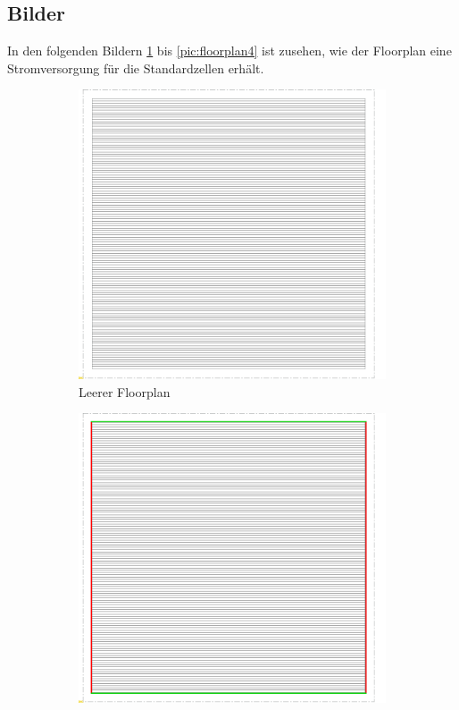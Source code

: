  \subsection{Bilder}
 In den folgenden Bildern \ref{pic:floorplan1} bis \ref{pic:floorplan4} ist zusehen, wie der Floorplan eine Stromversorgung für die Standardzellen erhält. 
    \begin{figure}
        \centering
        \begin{subfigure}[b]{0.475\textwidth}
            \centering
            \includegraphics[width=\textwidth]{img/DFT_FLOORPLAN/CROPPED_IMG/FP_1.png}
            \caption{{\small Leerer Floorplan}}    
            \label{pic:floorplan1}
        \end{subfigure}
        \hfill
        \begin{subfigure}[b]{0.475\textwidth}  
            \centering 
            \includegraphics[width=\textwidth]{img/DFT_FLOORPLAN/CROPPED_IMG/FP_2.png}

\end{subfigure}
\end{figure}
